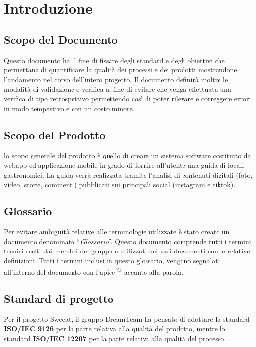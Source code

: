 \section{Introduzione}

\subsection{Scopo del Documento}
Questo documento ha il fine di fissare degli standard e degli obiettivi che permettano di quantificare la qualità dei processi e dei prodotti mostrandone l’andamento nel corso dell’intero progetto.
Il documento definirà inoltre le modalità di validazione e verifica al fine di evitare che venga effettuata una verifica di tipo retrospettivo permettendo così di poter rilevare e correggere errori in modo tempestivo e con un costo minore.


\subsection{Scopo del Prodotto}

lo scopo generale del prodotto è quello di creare un sistema software costituito da webapp ed applicazione mobile in grado di fornire all’utente una guida di locali gastronomici. La guida verrà realizzata tramite l’analisi di contenuti digitali (foto, video, storie, commenti) pubblicati sui principali social (instagram e tiktok).  
\subsection{Glossario}

Per evitare ambiguità relative alle terminologie utilizzate è stato creato un documento denominato “\textit{Glossario}”. Questo documento comprende tutti i termini tecnici scelti dai membri del gruppo e utilizzati nei vari documenti con le relative definizioni. Tutti i termini inclusi in questo glossario, vengono segnalati all’interno del documento con l’apice \textsuperscript{G} accanto alla parola.

\subsection{Standard di progetto}
Per il progetto Sweeat, il gruppo DreamTeam ha pensato di adottare lo standard \textbf{ISO/IEC 9126} per la parte relativa alla qualità del prodotto, mentre lo standard \textbf{ISO/IEC 12207} per la parte relativa alla qualità del processo.
